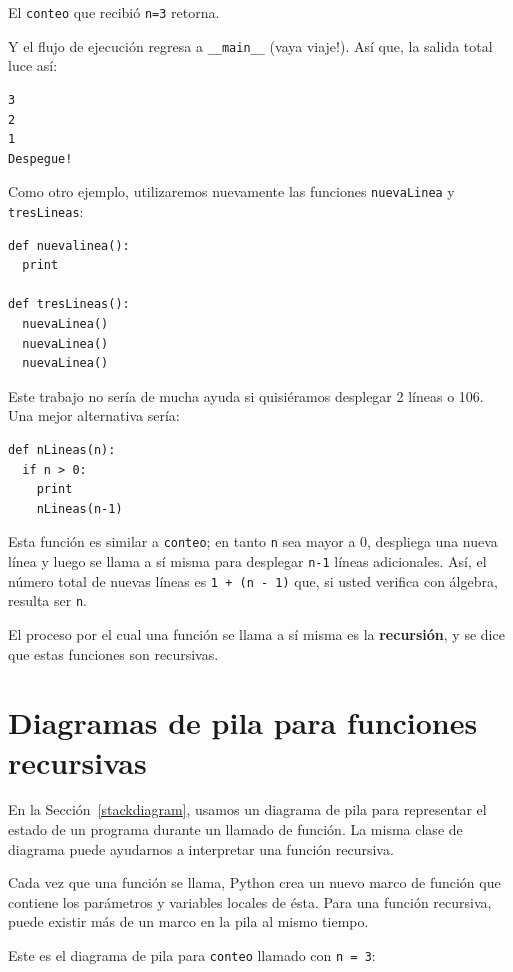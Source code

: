 El  \texttt{conteo} que recibió \texttt{n=3} retorna.

Y  el flujo de ejecución regresa a \texttt{\_\_main\_\_} (vaya viaje!).  Así que, la 
salida total luce así:

\beforeverb
\begin{verbatim}
3
2
1
Despegue!
\end{verbatim}
\afterverb
%
Como otro ejemplo, utilizaremos nuevamente las funciones \texttt{nuevaLinea} y
\texttt{tresLineas}:

\beforeverb
\begin{verbatim}
def nuevalinea():
  print

def tresLineas():
  nuevaLinea()
  nuevaLinea()
  nuevaLinea()
\end{verbatim}
\afterverb
%
Este trabajo no sería de mucha ayuda si quisiéramos desplegar 2 líneas o 106.
Una mejor alternativa sería:

\beforeverb
\begin{verbatim}
def nLineas(n):
  if n > 0:
    print
    nLineas(n-1)
\end{verbatim}
\afterverb
%
Esta función es similar a \texttt{conteo}; en tanto \texttt{n} sea 
mayor a 0, despliega una nueva línea y luego se llama a sí misma
para desplegar \texttt{n-1} líneas adicionales.  Así, el número total de
nuevas líneas es \texttt{1 + (n - 1)} que, si usted verifica con álgebra, resulta
ser \texttt{n}.

El proceso por el cual una función se llama a sí misma es la 
 {\bf recursión}, y se dice que estas funciones son recursivas.



\section{Diagramas de pila para funciones recursivas}

En la Sección~\ref{stackdiagram}, usamos un diagrama de pila para
representar el estado de un programa durante un llamado de función.
La misma clase de diagrama puede ayudarnos a interpretar una función
recursiva.

Cada vez que una función se llama, Python crea un nuevo marco de función
que contiene los parámetros y variables locales de ésta. Para una
función recursiva, puede existir más de un marco en la pila al mismo
tiempo.

Este es el diagrama de pila para \texttt{conteo} llamado con \texttt{n = 3}:

